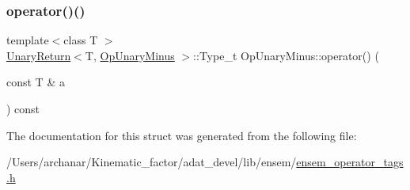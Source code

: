 \mbox{\label{structOpUnaryMinus_a76748f9d3b2f6a7bebac4a7427f86e3d}} 
\subsubsection{\texorpdfstring{operator()()}{operator()()}\hspace{0.1cm}{\footnotesize\ttfamily [2/2]}}
{\footnotesize\ttfamily template$<$class T $>$ \\
\mbox{\hyperlink{structUnaryReturn}{Unary\+Return}}$<$T, \mbox{\hyperlink{structOpUnaryMinus}{Op\+Unary\+Minus}} $>$\+::Type\+\_\+t Op\+Unary\+Minus\+::operator() (\begin{DoxyParamCaption}\item[{const T \&}]{a }\end{DoxyParamCaption}) const\hspace{0.3cm}{\ttfamily [inline]}}



The documentation for this struct was generated from the following file\+:\begin{DoxyCompactItemize}
\item 
/\+Users/archanar/\+Kinematic\+\_\+factor/adat\+\_\+devel/lib/ensem/\mbox{\hyperlink{lib_2ensem_2ensem__operator__tags_8h}{ensem\+\_\+operator\+\_\+tags.\+h}}\end{DoxyCompactItemize}
